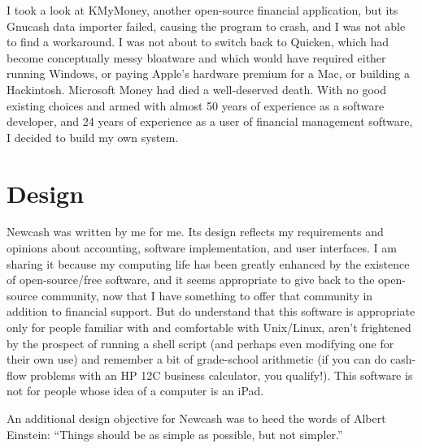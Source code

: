 \documentclass{report}
\begin{document}
I took a look at KMyMoney, another open-source financial application, but its Gnucash data importer failed, causing the program to crash, and I was not able to find a workaround. 
I was not about to switch back to Quicken, which had become conceptually messy bloatware and which would have required either running Windows, or paying Apple's hardware premium for a Mac, or building a Hackintosh. 
Microsoft Money had died a well-deserved death. With no good existing choices and armed with almost 50 years of experience as a software developer, and 24 years of experience as a user of financial management software, 
I decided to build my own system. 
\chapter{Design}
Newcash was written by me for me. Its design reflects my requirements and opinions about accounting, software implementation, and user interfaces. I am sharing it because my computing life has been greatly enhanced by the existence of open-source/free software, and it seems appropriate to give back to the open-source community, now that I have something to offer that community in addition to financial support. But do understand that this software is appropriate only for people familiar with and comfortable with Unix/Linux, aren't frightened by the prospect of running a shell script (and perhaps even modifying one for their own use) and remember a bit of grade-school arithmetic (if you can do cash-flow problems with an HP 12C business calculator, you qualify!). This software is not for people whose idea of a computer is an iPad.

An additional design objective for Newcash was to  heed the words of Albert Einstein: ``Things should be as simple as possible, but not simpler.''  
\end{document}
